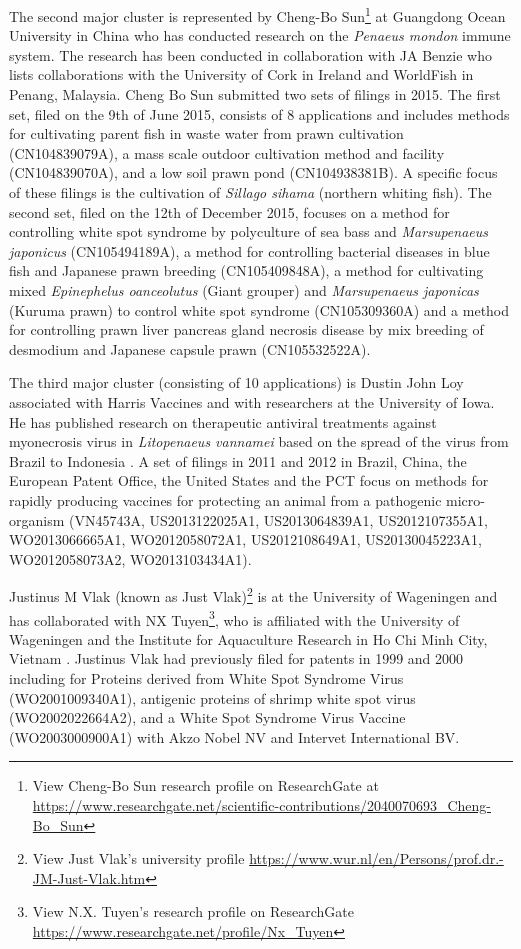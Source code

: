 \documentclass[]{book}
\let\rmarkdownfootnote\footnote%
\def\footnote{\protect\rmarkdownfootnote}
\theoremstyle{definition}
\theoremstyle{definition}
\theoremstyle{definition}
\theoremstyle{remark}
\begin{document}
The second major cluster is represented by Cheng-Bo Sun\footnote{View
  Cheng-Bo Sun research profile on ResearchGate at
  \url{https://www.researchgate.net/scientific-contributions/2040070693_Cheng-Bo_Sun}}
at Guangdong Ocean University in China who has conducted research on the
\emph{Penaeus mondon} immune system. The research has been conducted in
collaboration with JA Benzie who lists collaborations with the
University of Cork in Ireland and WorldFish in Penang, Malaysia. Cheng
Bo Sun submitted two sets of filings in 2015. The first set, filed on
the 9th of June 2015, consists of 8 applications and includes methods
for cultivating parent fish in waste water from prawn cultivation
(CN104839079A), a mass scale outdoor cultivation method and facility
(CN104839070A), and a low soil prawn pond (CN104938381B). A specific
focus of these filings is the cultivation of \emph{Sillago sihama}
(northern whiting fish). The second set, filed on the 12th of December
2015, focuses on a method for controlling white spot syndrome by
polyculture of sea bass and \emph{Marsupenaeus japonicus}
(CN105494189A), a method for controlling bacterial diseases in blue fish
and Japanese prawn breeding (CN105409848A), a method for cultivating
mixed \emph{Epinephelus oanceolutus} (Giant grouper) and
\emph{Marsupenaeus japonicas} (Kuruma prawn) to control white spot
syndrome (CN105309360A) and a method for controlling prawn liver
pancreas gland necrosis disease by mix breeding of desmodium and
Japanese capsule prawn (CN105532522A).

The third major cluster (consisting of 10 applications) is Dustin John
Loy associated with Harris Vaccines and with researchers at the
University of Iowa. He has published research on therapeutic antiviral
treatments against myonecrosis virus in \emph{Litopenaeus vannamei}
based on the spread of the virus from Brazil to Indonesia
\citep{Loy_2012, Loy_2013}. A set of filings in 2011 and 2012 in Brazil,
China, the European Patent Office, the United States and the PCT focus
on methods for rapidly producing vaccines for protecting an animal from
a pathogenic micro-organism (VN45743A, US2013122025A1, US2013064839A1,
US2012107355A1, WO2013066665A1, WO2012058072A1, US2012108649A1,
US20130045223A1, WO2012058073A2, WO2013103434A1).

Justinus M Vlak (known as Just Vlak)\footnote{View Just Vlak's
  university profile
  \url{https://www.wur.nl/en/Persons/prof.dr.-JM-Just-Vlak.htm}} is at
the University of Wageningen and has collaborated with NX
Tuyen\footnote{View N.X. Tuyen's research profile on ResearchGate
  \url{https://www.researchgate.net/profile/Nx_Tuyen}}, who is
affiliated with the University of Wageningen and the Institute for
Aquaculture Research in Ho Chi Minh City, Vietnam
\citep[see][]{Tuyen_2014}. Justinus Vlak had previously filed for
patents in 1999 and 2000 including for Proteins derived from White Spot
Syndrome Virus (WO2001009340A1), antigenic proteins of shrimp white spot
virus (WO2002022664A2), and a White Spot Syndrome Virus Vaccine
(WO2003000900A1) with Akzo Nobel NV and Intervet International BV.
\end{document}
